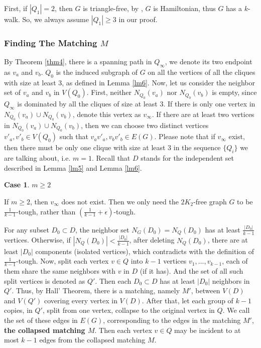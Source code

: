\documentclass[12pt]{article}
\newtheorem{case}{Case}
\begin{document}
First, if $|Q_1|=2$, then $G$ is triangle-free, by \cite[Theorem 4]{broersma2014toughness}, $G$ is Hamiltonian, thus $G$ has a $k$-walk. So, we always assume $|Q_1|\ge3$ in our proof.

\subsubsection{Finding The Matching $M$}
By Theorem \ref{thm4}, there is a spanning path in $Q_{\infty}$, we denote its two endpoint as $v_a$ and $v_b$. $Q_0$ is the induced subgraph of $G$ on all the vertices of all the cliques with size at least 3, as defined in Lemma \ref{lm6}. Now, let us consider the neighbor set of $v_a$ and $v_b$ in $V(Q_0)$. First, neither $N_{Q_0}(v_a)$ nor $N_{Q_0}(v_b)$ is empty, since $Q_{\infty}$ is dominated by all the cliques of size at least 3. If there is only one vertex in $N_{Q_0}(v_a)\cup N_{Q_0}(v_b)$, denote this vertex as $v_{\infty}$. If there are at least two vertices in $N_{Q_0}(v_a)\cup N_{Q_0}(v_b)$, then we can choose two distinct vertices $v'_a,v'_b\in V(Q_0)$ such that $v_av'_a,v_bv'_b\in E(G)$. Please note that if $v_{\infty}$ exist, then there must be only one clique with size at least 3 in the sequence $\{Q_i\}$ we are talking about, i.e. $m=1$.
Recall that $D$ stands for the independent set described in Lemma \ref{lm5} and Lemma \ref{lm6}. 

\begin{case}$m\ge2$\end{case}
If $m\ge2$, then $v_{\infty}$ does not exist. Then we only need the $2K_2$-free graph $G$ to be $\frac{1}{k-1}$-tough, rather than $(\frac{1}{k-1}+\epsilon)$-tough.

For any subset $D_0\subset D$, the neighbor set $N_{G}(D_0)=N_Q(D_0)$ has at least $\frac{|D_0|}{k-1}$ vertices. Otherwise, if $|N_Q(D_0)|<\frac{|D_0|}{k-1}$, after deleting $N_Q(D_0)$, there are at least $|D_0|$ components (isolated vertices), which contradicts with the definition of $\frac{1}{k-1}$-tough. 
Now, split each vertex $v\in Q$ into $k-1$ vertices $v_1,\ldots,v_{k-1}$, each of them share the same neighbors with $v$ in $D$ (if it has). And the set of all such split vertices is denoted as $Q'$.  Then each $D_0\subset D$ has at least $|D_0|$ neighbors in $Q'$.
Thus, by Hall' Theorem, there is a matching, namely $M'$, between $V(D)$ and $V(Q')$ covering every vertex in $V(D)$. 
After that, let each group of $k-1$ copies, in $Q'$, split from one vertex, collapse to the original vertex in $Q$. We call the set of these edges in $E(G)$, corresponding to the edges in the matching $M'$, {\bf the collapsed matching $M$}. Then each vertex $v\in Q$ may be incident to at most $k-1$ edges from the collapsed matching $M$. 
\end{document}
